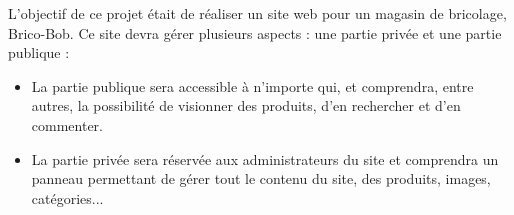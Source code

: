 L'objectif de ce projet était de réaliser un site web pour un magasin de bricolage, Brico-Bob.
Ce site devra gérer plusieurs aspects : une partie privée et une partie publique : \\

\begin{itemize}
\item La partie publique sera accessible à n'importe qui, et comprendra, entre autres, la possibilité de visionner des produits, d'en rechercher et d'en commenter.\\
\item La partie privée sera réservée aux administrateurs du site et comprendra un panneau permettant de gérer tout le contenu du site, des produits, images, catégories... 
\end{itemize}
 